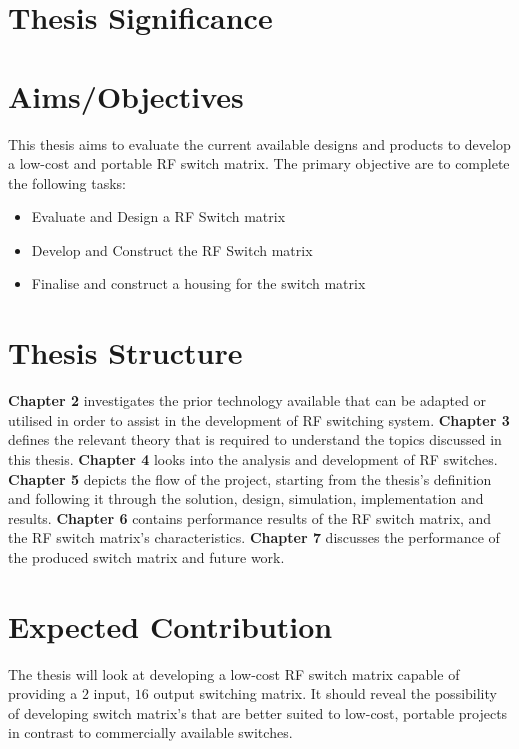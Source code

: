 \documentclass[12pt,openany,a4paper]{book}
\begin{document}
\section{Thesis Significance}



\section{Aims/Objectives}
This thesis aims to evaluate the current available designs and products to develop a low-cost and portable RF switch matrix. \newline
The primary objective are to complete the following tasks: \\[-0.8cm]
\begin{itemize}
	\setlength\itemsep{-0.5em}
	\item Evaluate and Design a RF Switch matrix
	\item Develop and Construct the RF Switch matrix
	\item Finalise and construct a housing for the switch matrix
\end{itemize}




\section{Thesis Structure}
\textbf{Chapter 2} investigates the prior technology available that can be adapted or utilised in order to assist in the development of RF switching system. \newline
\textbf{Chapter 3} defines the relevant theory that is required to understand the topics discussed in this thesis. \newline
\textbf{Chapter 4} looks into the analysis and development of RF switches. \newline
\textbf{Chapter 5} depicts the flow of the project, starting from the thesis's definition and following it through the solution, design, simulation, implementation and results. \newline
\textbf{Chapter 6} contains performance results of the RF switch matrix, and the RF switch matrix's characteristics. \newline
\textbf{Chapter 7} discusses the performance of the produced switch matrix and future work.  
\newline




\section{Expected Contribution}
The thesis will look at developing a low-cost RF switch matrix capable of providing a $2$ input, $16$ output switching matrix. It should reveal the possibility of developing switch matrix's that are better suited to low-cost, portable projects in contrast to commercially available switches.
\end{document}
